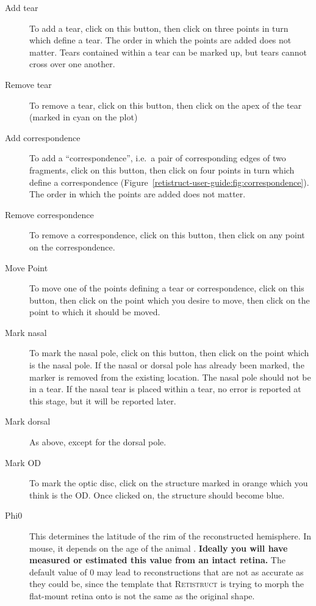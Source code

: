 \documentclass{book}
\begin{document}
\begin{description}
\item[Add tear] To add a tear, click on this button, then click on
  three points in turn which define a tear. The order in which the
  points are added does not matter. Tears contained within a tear can
  be marked up, but tears cannot cross over one another.
\item[Remove tear] To remove a tear, click on this button, then click
  on the apex of the tear (marked in cyan on the plot)
\item[Add correspondence] To add a ``correspondence'', i.e.~a pair of
  corresponding edges of two fragments, click on this button, then
  click on four points in turn which define a correspondence
  (Figure~\ref{retistruct-user-guide:fig:correspondence}). The order
  in which the points are added does not matter.
\item[Remove correspondence] To remove a correspondence, click on this
  button, then click on any point on the correspondence.
\item[Move Point] To move one of the points defining a tear or
  correspondence, click on this button, then click on the point which
  you desire to move, then click on the point to which it should be
  moved.
\item[Mark nasal] To mark the nasal pole, click on this button, then
  click on the point which is the nasal pole.  If the nasal or
  dorsal pole has already been marked, the marker is removed from
  the existing location. The nasal pole should not be in a tear. If
  the nasal tear is placed within a tear, no error is reported at this
  stage, but it will be reported later.
\item[Mark dorsal] As above, except for the dorsal pole.
\item[Mark OD] To mark the optic disc, click on the structure marked
  in orange which you think is the OD. Once clicked on, the structure
  should become blue.
\item[Phi0] This determines the latitude of the rim of the
  reconstructed hemisphere. In mouse, it depends on the age of the
  animal \cite{SterrattEtal2012}.
  \textbf{Ideally you will have measured or estimated this value from
    an intact retina.}
  The default value of 0 may lead to reconstructions that are not as
  accurate as they could be, since the template that
  \textsc{Retistruct} is trying to morph the flat-mount retina onto is
  not the same as the original shape.
\end{description}
\end{document}
